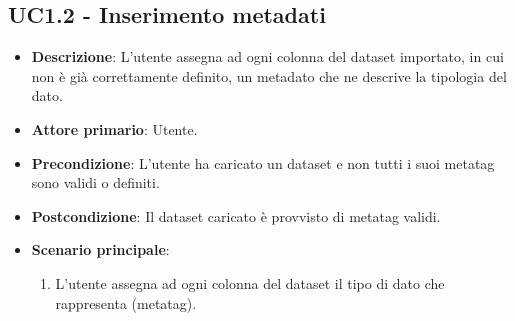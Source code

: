 \subsection{UC1.2 - Inserimento metadati}
\label{ssub:UC1.2}
\begin{itemize}
    \item \textbf{Descrizione}: L'utente assegna ad ogni colonna del dataset importato,
                                in cui non è già correttamente definito,
                                un metadato che ne descrive la tipologia del dato.


    \item \textbf{Attore primario}: Utente.
    
    \item \textbf{Precondizione}:   L'utente ha caricato un dataset e non tutti i suoi 
                                    metatag sono validi o definiti.

    \item \textbf{Postcondizione}:  Il dataset caricato è provvisto di metatag validi. 

	\item \textbf{Scenario principale}:
		\begin{enumerate}
			\item L'utente assegna ad ogni colonna del dataset il tipo di dato che rappresenta (metatag).
        \end{enumerate}

\end{itemize}

